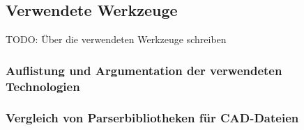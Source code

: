 \subsection{Verwendete Werkzeuge}
\label{subsec:used-tools}

TODO: Über die verwendeten Werkzeuge schreiben

\subsubsection{Auflistung und Argumentation der verwendeten Technologien}
\label{subsec:collection-tools}

\subsubsection{Vergleich von Parserbibliotheken für CAD-Dateien}
\label{subsubsec:comparison-parser-libs}
